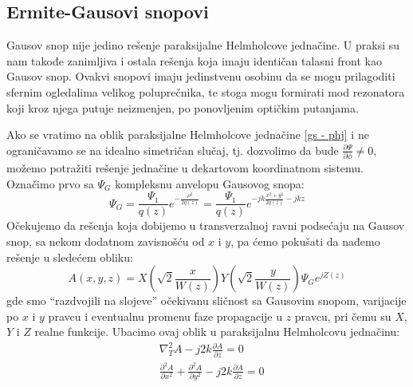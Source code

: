 \documentclass[fleqn]{report}
\begin{document}
\subsection{Ermite-Gausovi snopovi}

Gausov snop nije jedino rešenje paraksijalne Helmholcove jednačine.
U praksi su nam takođe zanimljiva i ostala rešenja koja imaju identičan talasni front kao Gausov snop.
Ovakvi snopovi imaju jedinstvenu osobinu da se mogu prilagoditi sfernim ogledalima velikog poluprečnika, te stoga mogu formirati mod rezonatora koji kroz njega putuje neizmenjen, po ponovljenim optičkim putanjama.

Ako se vratimo na oblik paraksijalne Helmholcove jednačine \eqref{gs - phj} i ne ograničavamo se na idealno simetričan slučaj, tj. dozvolimo da bude $\frac{\partial\Psi}{\partial\phi} \neq 0$, možemo potražiti rešenje jednačine u dekartovom koordinatnom sistemu.
Označimo prvo sa $\Psi_G$ kompleksnu anvelopu Gausovog snopa:
\begin{equation*}
    \Psi_G = \frac{\Psi_1}{q(z)} e^{-\frac{\rho^2}{2q(z)}} = \frac{\Psi_1}{q(z)}e^{-jk\frac{x^2 + y^2}{2q(z)} - jkz}
\end{equation*}
Očekujemo da rešenja koja dobijemo u transverzalnoj ravni podsećaju na Gausov snop, sa nekom dodatnom zavisnošću od $x$ i $y$, pa ćemo pokušati da nađemo rešenje u sledećem obliku:
\begin{equation*}
    A(x, y, z) = X\left(\sqrt{2}\frac{x}{W(z)}\right) Y\left(\sqrt2\frac{y}{W(z)}\right) \Psi_G e^{jZ(z)}
\end{equation*}
gde smo \enquote{razdvojili na slojeve} očekivanu sličnost sa Gausovim snopom, varijacije po $x$ i $y$ pravcu i eventualnu promenu faze propagacije u $z$ pravcu, pri čemu su $X$, $Y$ i $Z$ realne funkcije.
Ubacimo ovaj oblik u paraksijalnu Helmholcovu jednačinu:
\begin{align*}
     & \nabla_T^2A - j2k \frac{\partial A}{\partial z} = 0                                                           \\
     & \frac{\partial^2 A}{\partial x^2} + \frac{\partial^2 A}{\partial y^2} - j2k \frac{\partial A}{\partial z} = 0
\end{align*}
\end{document}
